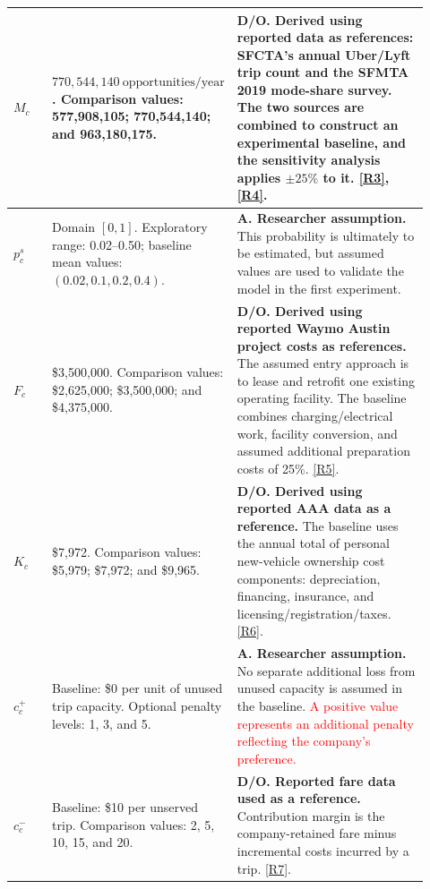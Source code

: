 \documentclass[10pt,a4paper]{article}
\begin{document}
\begin{longtable}{P{0.10\linewidth}P{0.34\linewidth}P{0.48\linewidth}}
$M_c$ & $770{,}544{,}140\ \text{opportunities/year}$. Comparison values: 577,908,105; 770,544,140; and 963,180,175. & \textbf{D/O. Derived using reported data as references:} SFCTA's annual Uber/Lyft trip count and the SFMTA 2019 mode-share survey. The two sources are combined to construct an experimental baseline, and the sensitivity analysis applies $\pm25\%$ to it. \hyperlink{rationale-R3}{[R3]}, \hyperlink{rationale-R4}{[R4]}. \\
\midrule

$p_c^s$ & Domain $[0,1]$. Exploratory range: 0.02--0.50; baseline mean values: $(0.02,0.1,0.2,0.4)$. & \textbf{A. Researcher assumption.} This probability is ultimately to be estimated, but assumed values are used to validate the model in the first experiment. \\
\midrule

$F_c$ & \$3,500,000. Comparison values: \$2,625,000; \$3,500,000; and \$4,375,000. & \textbf{D/O. Derived using reported Waymo Austin project costs as references.} The assumed entry approach is to lease and retrofit one existing operating facility. The baseline combines charging/electrical work, facility conversion, and assumed additional preparation costs of 25\%. \hyperlink{rationale-R5}{[R5]}. \\
\midrule

$K_c$ & \$7,972. Comparison values: \$5,979; \$7,972; and \$9,965. & \textbf{D/O. Derived using reported AAA data as a reference.} The baseline uses the annual total of personal new-vehicle ownership cost components: depreciation, financing, insurance, and licensing/registration/taxes. \hyperlink{rationale-R6}{[R6]}. \\
\midrule

$c_c^+$ & Baseline: \$0 per unit of unused trip capacity. Optional penalty levels: 1, 3, and 5. & \textbf{A. Researcher assumption.} No separate additional loss from unused capacity is assumed in the baseline. \textcolor{red}{A positive value represents an additional penalty reflecting the company's preference.} \\
\midrule

$c_c^-$ & Baseline: \$10 per unserved trip. Comparison values: 2, 5, 10, 15, and 20. & \textbf{D/O. Reported fare data used as a reference.} Contribution margin is the company-retained fare minus incremental costs incurred by a trip. \hyperlink{rationale-R7}{[R7]}. \\
\midrule

\bottomrule
\end{longtable}
\normalsize
\end{document}
